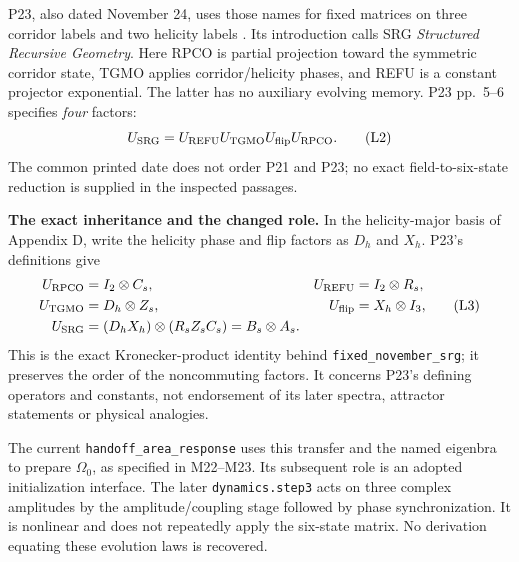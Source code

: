 P23, also dated November 24, uses those names for fixed matrices on three corridor labels and two helicity labels \cite{sixStateSRG}. Its introduction calls SRG \emph{Structured Recursive Geometry}. Here RPCO is partial projection toward the symmetric corridor state, TGMO applies corridor/helicity phases, and REFU is a constant projector exponential. The latter has no auxiliary evolving memory. P23 pp.~5--6 specifies \emph{four} factors:
\[
 U_{\rm SRG}=U_{\rm REFU}U_{\rm TGMO}U_{\rm flip}U_{\rm RPCO}.
\tag{L2}\label{eq:L2}
\]
The common printed date does not order P21 and P23; no exact field-to-six-state reduction is supplied in the inspected passages.

\textbf{The exact inheritance and the changed role.}
In the helicity-major basis of Appendix D, write the helicity phase and flip factors as \(D_h\) and \(X_h\). P23's definitions give
\[
\begin{aligned}
 U_{\rm RPCO}&=I_2\otimes C_s,&U_{\rm REFU}&=I_2\otimes R_s,\\
 U_{\rm TGMO}&=D_h\otimes Z_s,&U_{\rm flip}&=X_h\otimes I_3,\\
 U_{\rm SRG}&=(D_hX_h)\otimes(R_sZ_sC_s)=B_s\otimes A_s .
\end{aligned}
\tag{L3}\label{eq:L3}
\]
This is the exact Kronecker-product identity behind \texttt{fixed\_november\_srg}; it preserves the order of the noncommuting factors. It concerns P23's defining operators and constants, not endorsement of its later spectra, attractor statements or physical analogies.

The current \texttt{handoff\_area\_response} uses this transfer and the named eigenbra to prepare \(\Omega_0\), as specified in M22--M23. Its subsequent role is an adopted initialization interface. The later \texttt{dynamics.step3} acts on three complex amplitudes by the amplitude/coupling stage followed by phase synchronization. It is nonlinear and does not repeatedly apply the six-state matrix. No derivation equating these evolution laws is recovered.


